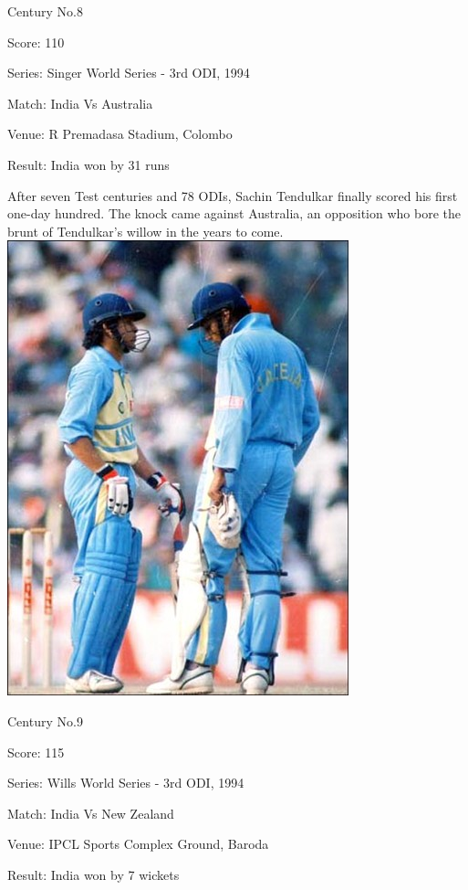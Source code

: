 \documentclass[11pt, a4paper]{article}
\begin{document}
Century No.8 

Score: 110 

Series: Singer World Series - 3rd ODI, 1994 

Match: India Vs Australia 

Venue: R Premadasa Stadium, Colombo 

Result: India won by 31 runs 

After seven Test centuries and 78 ODIs, Sachin Tendulkar finally scored his first one-day hundred. The knock came against Australia, an opposition who bore the brunt of Tendulkar's willow in the years to come.
\newpage
\includegraphics[height=0.8\textheight]{pics/9.jpg}

Century No.9 

Score: 115 

Series: Wills World Series - 3rd ODI, 1994 

Match: India Vs New Zealand 

Venue: IPCL Sports Complex Ground, Baroda 

Result: India won by 7 wickets 
\end{document}
